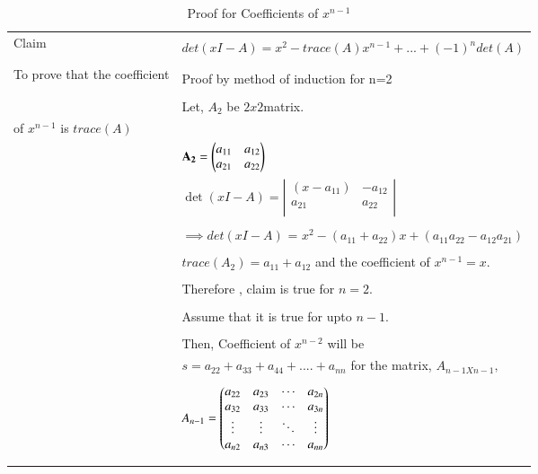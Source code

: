 \documentclass[journal,12pt]{IEEEtran}
\begin{document}
\begin{longtable}{|l|l|}
\hline
\multirow{3}{*}{Claim} & \\
&  $det(xI-A) = x^2 - trace(A)x^{n-1}+...+(-1)^ndet(A)$ \\
&\\
\hline
\multirow{3}{*}{To prove that the coefficient} &\\
& Proof by method of induction for n=2\\ 
&\\
& Let, $A_2$ be $2x2$matrix.\\ 
of $x^{n-1}$ is $trace(A)$ 
&\\
& $\mathbf{A_2}=\begin{pmatrix}a_{11}&a_{12}\\a_{21}&a_{22}\end{pmatrix}$\\
& $\det(xI-A)= \left|
                \begin{array}{ccc}
                (x-a_{11}) & -a_{12}\\
                a_{21}& a_{22}\\
                \end{array} \right|$  \\
&\\
& $\implies det(xI-A)$ = $x^2 - (a_{11}+a_{22})x+(a_{11}a_{22}-a_{12}a_{21})$\\
 &\\
& $\boxed {trace(A_2) = a_{11}+a_{12}}$ and the coefficient of $\boxed{x^{n-1} = x}$.\\
&\\
& Therefore , claim is true for $n=2$. \\
&\\
& Assume that it is true for upto $n-1$.\\
& \\
& Then, Coefficient of $x^{n-2}$ will be\\
& $\boxed{s=a_{22}+a_{33}+a_{44}+....+a_{nn}}$ for the matrix, $A_{n-1Xn-1},$\\
&\\
& $A_{n-1} = \begin{pmatrix}a_{22}&a_{23}&\cdots &a_{2n} \\
a_{32}&a_{33}&\cdots &a_{3n} \\
\vdots & \vdots & \ddots & \vdots\\
a_{n2}&a_{n3}&\cdots &a_{nn}\end{pmatrix}$\\
&\\
\hline
\caption{Proof for Coefficients of $x^{n-1}$}
\label{table:1}
\end{longtable}
\newpage
\renewcommand{\thetable}{2}
\end{document}
